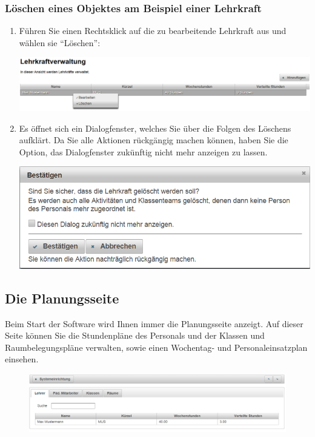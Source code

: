 \documentclass[fontsize=12pt]{scrartcl}
\begin{document}
\subsubsection{Löschen eines Objektes am Beispiel einer Lehrkraft}
\begin{enumerate}
\item Führen Sie einen Rechtsklick auf die zu bearbeitende Lehrkraft aus und wählen sie "`Löschen"': \medskip\\
	\begin{minipage}[t]{\linewidth}
            \includegraphics[width=1\linewidth]{images/editTeacher.png}
    \end{minipage}
\item Es öffnet sich ein Dialogfenster, welches Sie über die Folgen des Löschens aufklärt. Da Sie alle Aktionen rückgängig machen können, haben Sie die Option, das Dialogfenster zukünftig nicht mehr anzeigen zu lassen. \medskip\\
	\begin{minipage}[t]{\linewidth}
            \includegraphics[width=.8\linewidth]{images/confirmDialog.png}
    \end{minipage} 
\end{enumerate}

\subsection{Die Planungsseite}
Beim Start der Software wird Ihnen immer die Planungsseite anzeigt. Auf dieser Seite können Sie die Stundenpläne des Personals und der Klassen und Raumbelegungspläne verwalten, sowie einen Wochentag- und Personaleinsatzplan einsehen.

\begin{figure}[H]
\centering
\includegraphics[width=\textwidth]{images/planningPage.png}
\end{figure}
\end{document}
